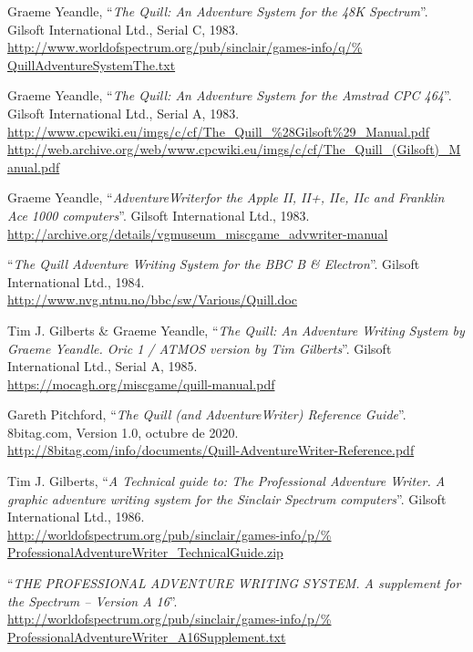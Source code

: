 \documentclass[11pt, a5paper]{article}
\begin{document}
\begin{thebibliography}{99}

  Graeme Yeandle,
  ``\emph{The Quill: An Adventure System for the 48K Spectrum}''.
  Gilsoft International Ltd.,
  Serial C,
  1983.\\
  \url{http://www.worldofspectrum.org/pub/sinclair/games-info/q/%
       QuillAdventureSystemThe.txt}

  Graeme Yeandle,
  ``\emph{The Quill: An Adventure System for the Amstrad CPC 464}''.
  Gilsoft International Ltd.,
  Serial A,
  1983.\\
  \url{http://www.cpcwiki.eu/imgs/c/cf/The_Quill_%28Gilsoft%29_Manual.pdf}\\
  \url{http://web.archive.org/web/www.cpcwiki.eu/imgs/c/cf/The_Quill_(Gilsoft)_Manual.pdf}

  Graeme Yeandle,
  ``\emph{AdventureWriter\texttrademark for the Apple II, II+, IIe, IIc and Franklin Ace 1000 computers}''.
  Gilsoft International Ltd.,
  1983.\\
  \url{http://archive.org/details/vgmuseum_miscgame_advwriter-manual}

  ``\emph{The Quill Adventure Writing System for the BBC B \& Electron}''.
  Gilsoft International Ltd.,
  1984.\\
  \url{http://www.nvg.ntnu.no/bbc/sw/Various/Quill.doc}

  Tim J. Gilberts \& Graeme Yeandle,
  ``\emph{The Quill: An Adventure Writing System by Graeme Yeandle. Oric 1 /
  ATMOS version by Tim Gilberts}''.
  Gilsoft International Ltd.,
  Serial A,
  1985.\\
  \url{https://mocagh.org/miscgame/quill-manual.pdf}

  Gareth Pitchford,
  ``\emph{The Quill (and AdventureWriter) Reference Guide}''.
  8bitag.com,
  Version 1.0,
  octubre de 2020.\\
  \url{http://8bitag.com/info/documents/Quill-AdventureWriter-Reference.pdf}

  Tim J. Gilberts,
  ``\emph{A Technical guide to: The Professional Adventure Writer. A graphic
  adventure writing system for the Sinclair Spectrum computers}''.
  Gilsoft International Ltd.,
  1986.\\
  \url{http://worldofspectrum.org/pub/sinclair/games-info/p/%
       ProfessionalAdventureWriter_TechnicalGuide.zip}

  ``\emph{THE PROFESSIONAL ADVENTURE WRITING SYSTEM. A supplement for the
  Spectrum -- Version A 16}''.\\
  \url{http://worldofspectrum.org/pub/sinclair/games-info/p/%
       ProfessionalAdventureWriter_A16Supplement.txt}


\end{thebibliography}
\end{document}
